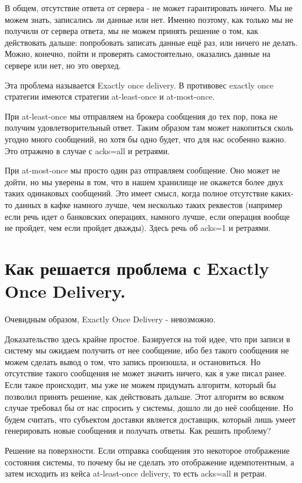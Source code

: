 \documentclass[11pt]{article}
\begin{document}
    В общем, отсутствие ответа от сервера - не может гарантировать ничего. Мы не можем знать, записались ли данные или нет. Именно поэтому, как только мы не получили от сервера ответа, мы не можем принять решение о том, как действовать дальше: попробовать записать данные ещё раз, или ничего не делать. Можно, конечно, пойти и проверять самостоятельно, оказались данные на сервере или нет, но это оверхед.

    Эта проблема называется Exactly once delivery. В противовес exactly once стратегии имеются стратегии at-least-once и at-most-once.

    При at-least-once мы отправляем на брокера сообщения до тех пор, пока не получим удовлетворительный ответ. Таким образом там может накопиться сколь угодно много сообщений, но хотя бы одно будет, что для нас особенно важно. Это отражено в случае с acks=all и ретраями.

    При at-most-once мы просто один раз отправляем сообщение. Оно может не дойти, но мы уверены в том, что в нашем хранилище не окажется более двух таких одинаковых сообщений. Это имеет смысл, когда полное отсутствие каких-то данных в кафке намного лучше, чем несколько таких реквестов (например если речь идет о банковских операциях, намного лучше, если операция вообще не пройдет, чем если пройдет дважды). Здесь речь об acks=1 и ретраями.

    \section{Как решается проблема с Exactly Once Delivery.}
    Очевидным образом, Exactly Once Delivery - невозможно.

    Доказательство здесь крайне простое. Базируется на той идее, что при записи в систему мы ожидаем получить от нее сообщение, ибо без такого сообщения не можем сделать вывод о том, что запись произошла, и остановиться. Но отсутствие такого сообщения не может значить ничего, как я уже писал ранее.
    Если такое происходит, мы уже не можем придумать алгоритм, который бы позволил принять решение, как действовать дальше. Этот алгоритм во всяком случае требовал бы от нас спросить у системы, дошло ли до неё сообщение. Но будем считать, что субъектом доставки является доставщик, который лишь умеет генерировать новые сообщения и получать ответы. Как решить проблему?

    Решение на поверхности. Если отправка сообщения это некоторое отображение состояния системы, то почему бы не сделать это отображение идемпотентным, а затем исходить из кейса at-least-once delivery, то есть acks=all и ретраи.
\end{document}
